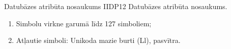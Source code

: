 {Datubāzes atribūta nosaukums}
{IIDP12}
{
	Datubāzes atribūta nosaukums.
}
{
	\begin{enumerate}
		\item Simbolu virkne garumā līdz 127 simboliem;
		\item Atļautie simboli: Unikoda mazie burti (Ll), pasvītra.
	\end{enumerate}
}
{
}
